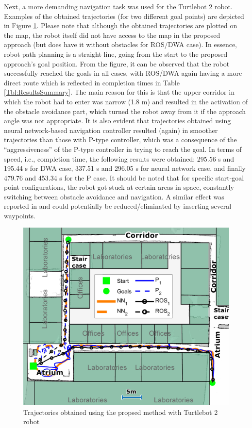 Next, a more demanding navigation task was used for the Turtlebot 2 robot. Examples of the obtained trajectories (for two different goal points) are depicted in Figure \ref{Fig:Trajektorije_hodnik}. Please note that although the obtained trajectories are plotted on the map, the robot itself did not have access to the map in the proposed approach (but does have it without obstacles for ROS/DWA case). In essence, robot path planning is a straight line, going from the start to the proposed approach's goal position. From the figure, it can be observed that the robot successfully reached the goals in all cases, with ROS/DWA again having a more direct route which is reflected in completion times in Table \ref{Tbl:ResultsSummary}. The main reason for this is that the upper corridor in which the robot had to enter was narrow (1.8 m) and resulted in the activation of the obstacle avoidance part, which turned the robot away from it if the approach angle was not appropriate. It is also evident that trajectories obtained using neural network-based navigation controller resulted (again) in smoother trajectories than those with P-type controller, which was a consequence of the ``aggressiveness'' of the P-type controller in trying to reach the goal. In terms of speed, i.e., completion time, the following results were obtained: 295.56 s and 195.44 s for DWA case, 337.51 s and 296.05 s for neural network case, and finally 479.76 and 453.34 s for the P case. It should be noted that for specific start-goal point configurations, the robot got stuck at certain areas in space, constantly switching between obstacle avoidance and navigation. A similar effect was reported in \cite{Pfeiffer2017} and could potentially be reduced/eliminated by inserting several waypoints.

\begin{figure}
\centering
\includegraphics[width=0.85\columnwidth]{slike/res_hodnik1.jpg}
\caption{Trajectories obtained using the propsed method with Turtlebot 2 robot}
\label{Fig:Trajektorije_hodnik}
\end{figure}

